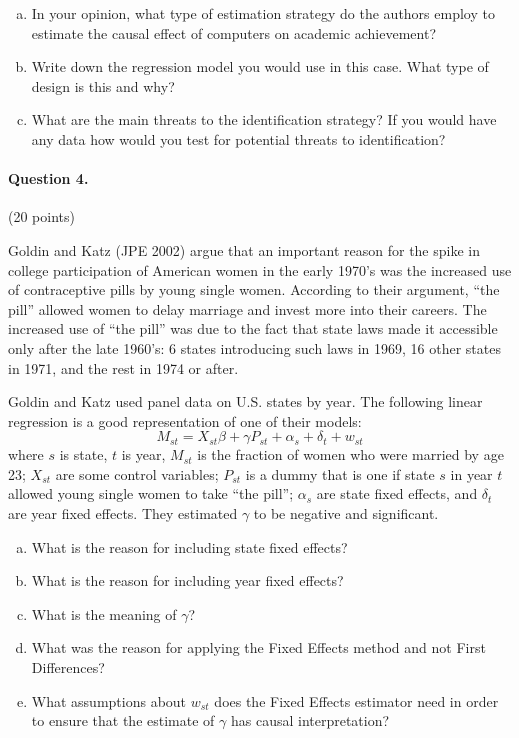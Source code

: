 \documentclass[a4paper, 12pt]{article}
\begin{document}
\begin{enumerate}[(a)]
\item  In your opinion, what type of estimation strategy do the authors employ to estimate the causal effect of computers on academic achievement? 
\item  Write down the regression model you would use in this case. What type of design is this and why?
\item  What are the main threats to the identification strategy? If you would have any data how would you test for potential threats to identification?
\end{enumerate}


\paragraph{Question 4.} (20 points)

Goldin and Katz (JPE 2002) argue that an important reason for the spike in college participation of American women in the early 1970’s was the increased use of contraceptive pills by young single women. According to their argument, ``the pill'' allowed women to delay marriage and invest more into their careers. The increased use of ``the pill'' was due to the fact that state laws made it accessible only after the late 1960’s: 6 states introducing such laws in 1969, 16 other states in 1971, and the rest in 1974 or after.

Goldin and Katz used panel data on U.S. states by year. The following linear regression is a good representation of one of their models:
\begin{equation*}
	M_{st} = X_{st}\beta + \gamma P_{st} + \alpha_s + \delta_t + w_{st}
\end{equation*}
where $s$ is state, $t$ is year, $M_{st}$ is the fraction of women who were married by age 23; $X_{st}$ are some control variables; $P_{st}$ is a dummy that is one if state $s$ in year $t$ allowed young single women to take ``the pill''; $\alpha_s$ are state fixed effects, and $\delta_t$ are year fixed effects. They estimated $\gamma$ to be negative and significant.

\begin{enumerate}[(a)]
	\item What is the reason for including state fixed effects?
	\item What is the reason for including year fixed effects?
	\item What is the meaning of $\gamma$?
	\item What was the reason for applying the Fixed Effects method and not First Differences?
	\item What assumptions about $w_{st}$ does the Fixed Effects estimator need in order to ensure that the estimate of $\gamma$ has causal interpretation?
\end{enumerate}
\end{document}
